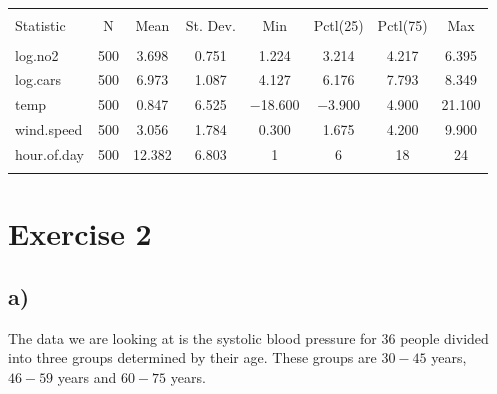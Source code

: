 \documentclass[a4paper,norsk, 10pt]{article}
\begin{document}
\begin{table}[!htbp] \centering 
  \caption{} 
  \label{} 
\begin{tabular}{@{\extracolsep{5pt}}lccccccc} 
\\[-1.8ex]\hline 
\hline \\[-1.8ex] 
Statistic & \multicolumn{1}{c}{N} & \multicolumn{1}{c}{Mean} & \multicolumn{1}{c}{St. Dev.} & \multicolumn{1}{c}{Min} & \multicolumn{1}{c}{Pctl(25)} & \multicolumn{1}{c}{Pctl(75)} & \multicolumn{1}{c}{Max} \\ 
\hline \\[-1.8ex] 
log.no2 & 500 & 3.698 & 0.751 & 1.224 & 3.214 & 4.217 & 6.395 \\ 
log.cars & 500 & 6.973 & 1.087 & 4.127 & 6.176 & 7.793 & 8.349 \\ 
temp & 500 & 0.847 & 6.525 & $-$18.600 & $-$3.900 & 4.900 & 21.100 \\ 
wind.speed & 500 & 3.056 & 1.784 & 0.300 & 1.675 & 4.200 & 9.900 \\ 
hour.of.day & 500 & 12.382 & 6.803 & 1 & 6 & 18 & 24 \\ 
\hline \\[-1.8ex] 
\end{tabular} 
\end{table} 

\section*{Exercise 2}
\subsection*{a)}

The data we are looking at is the systolic blood pressure for $36$ people divided into three groups determined by their age. These groups are $30-45$ years, $46-59$ years and $60-75$ years. 
\end{document}
